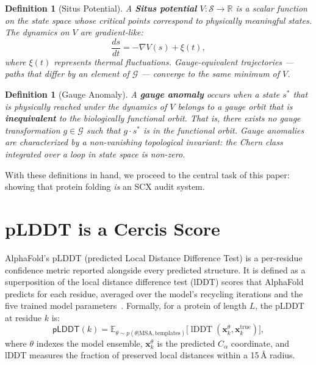 \documentclass[12pt,a4paper]{article}
\newtheorem{definition}[theorem]{Definition}
\theoremstyle{remark}
\newcommand{\R}{\mathbb{R}}
\newcommand{\E}{\mathbb{E}}
\newcommand{\G}{\mathcal{G}}
\newcommand{\Sstruct}{\mathcal{S}}
\newcommand{\pLDDT}{\textsf{pLDDT}}
\DeclareMathOperator{\lDDT}{lDDT}
\begin{document}
\begin{definition}[Situs Potential]
\label{def:situs}
A \textbf{Situs potential} $V: \Sstruct \to \R$ is a scalar function on the state space whose critical points correspond to physically meaningful states.
The dynamics on $V$ are gradient-like:
\begin{equation}
    \frac{d s}{d t} = -\nabla V(s) + \xi(t),
\end{equation}
where $\xi(t)$ represents thermal fluctuations.
Gauge-equivalent trajectories — paths that differ by an element of $\G$ — converge to the same minimum of $V$.
\end{definition}

\begin{definition}[Gauge Anomaly]
\label{def:gauge-anomaly}
A \textbf{gauge anomaly} occurs when a state $s^*$ that is physically reached under the dynamics of $V$ belongs to a gauge orbit that is \textbf{inequivalent} to the biologically functional orbit.
That is, there exists no gauge transformation $g \in \G$ such that $g \cdot s^*$ is in the functional orbit.
Gauge anomalies are characterized by a non-vanishing topological invariant: the Chern class integrated over a loop in state space is non-zero.
\end{definition}

With these definitions in hand, we proceed to the central task of this paper: showing that protein folding \emph{is} an SCX audit system.

\section{pLDDT is a Cercis Score}
\label{sec:plddt-cercis}

AlphaFold's pLDDT (predicted Local Distance Difference Test) is a per-residue confidence metric reported alongside every predicted structure.
It is defined as a superposition of the local distance difference test (lDDT) scores that AlphaFold predicts for each residue, averaged over the model's recycling iterations and the five trained model parameters~\cite{jumper2021highly}.
Formally, for a protein of length $L$, the pLDDT at residue $k$ is:
\begin{equation}
    \pLDDT(k) = \E_{\theta \sim p(\theta|\text{MSA},\text{templates})}\big[ \lDDT(\mathbf{x}_k^\theta, \mathbf{x}_k^{\text{true}}) \big],
\end{equation}
where $\theta$ indexes the model ensemble, $\mathbf{x}_k^\theta$ is the predicted $C_\alpha$ coordinate, and lDDT measures the fraction of preserved local distances within a 15\,\AA{} radius.
\end{document}
